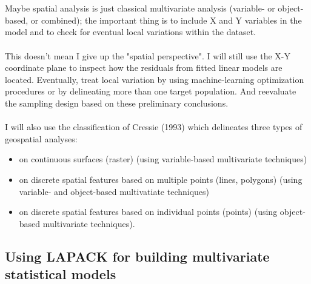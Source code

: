 \documentclass {article}
\begin{document}
\\
\\
Maybe spatial analysis is just classical multivariate analysis (variable- or object-based, or combined); the important thing is to include X and Y variables in the model and to check for eventual local variations within the dataset.
\\
\\
This doesn't mean I give up the "spatial perspective". I will still use the X-Y coordinate plane to inspect how the residuals from fitted linear models are located. Eventually, treat local variation by using machine-learning optimization procedures or by delineating more than one target population. And reevaluate the sampling design based on these preliminary conclusions.
\\
\\
I will also use the classification of Cressie (1993) \cite{cressie_statistics_1993} which delineates three types of geospatial analyses:
\begin{itemize}
\item on continuous surfaces (raster) (using variable-based multivariate techniques)
\item on discrete spatial features based on multiple points (lines, polygons) (using variable- and object-based multivatiate techniques)
\item on discrete spatial features based on individual points (points) (using object-based multivariate techniques).
\end{itemize}


\subsection {Using LAPACK for building multivariate statistical models}
\end{document}
